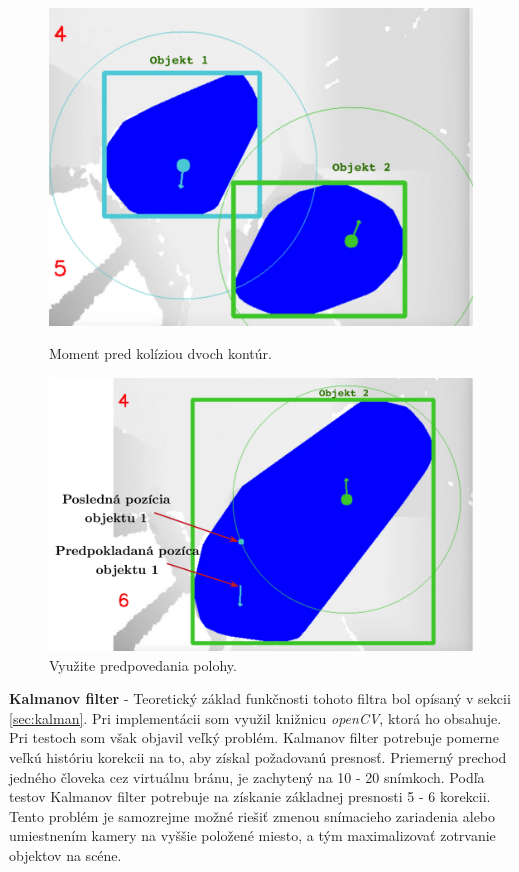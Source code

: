\begin{figure}[H]
  \centering
  \begin{minipage}[b]{0.4\textwidth}
    \includegraphics[width=\textwidth]{images/beforeCollision}
    \caption{Moment pred kolíziou dvoch kontúr.}
  \end{minipage}
  \hfill
  \begin{minipage}[b]{0.55\textwidth}
    \includegraphics[width=\textwidth]{images/predicate}
    \caption{Využite predpovedania polohy.}
  \end{minipage}
\end{figure}



\textbf{Kalmanov filter} - Teoretický základ funkčnosti tohoto filtra bol opísaný v sekcii \ref{sec:kalman}. Pri implementácii som využil knižnicu \textit{openCV}, ktorá ho obsahuje. Pri testoch som však objavil veľký problém. Kalmanov filter potrebuje pomerne veľkú históriu korekcii na to, aby získal požadovanú presnosť. Priemerný prechod jedného človeka cez virtuálnu bránu, je zachytený na 10 - 20 snímkoch. Podľa testov Kalmanov filter potrebuje na získanie základnej presnosti 5 - 6 korekcii. Tento problém je samozrejme možné riešiť zmenou snímacieho zariadenia alebo umiestnením kamery na vyššie položené miesto, a tým maximalizovať zotrvanie objektov na scéne. 


